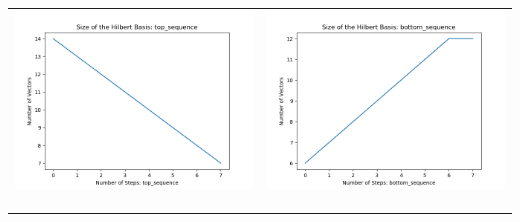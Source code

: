 \documentclass[10pt]{article}
\begin{document}
\begin{tabular}{c|c}
\begin{minipage}{.45\textwidth}
\includegraphics[width=\textwidth]{"DATA/5d/5 generators 2 bound A/top_sequence SIZE"}
\end{minipage} &
\begin{minipage}{.45\textwidth}
\includegraphics[width=\textwidth]{"DATA/5d/5 generators 2 bound A bottomup/bottom_sequence SIZE"}
\end{minipage} \\ \\
\hline \\\begin{minipage}{.45\textwidth}

\end{minipage}
\end{tabular}
\end{document}
